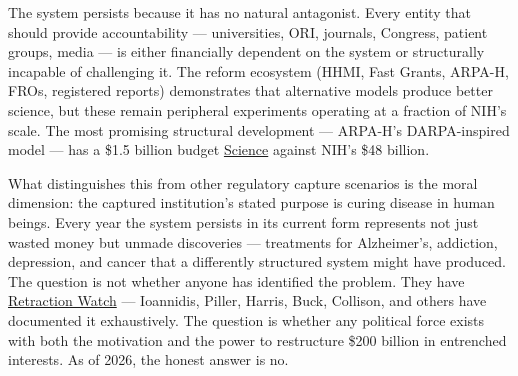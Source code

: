 The system persists because it has no natural antagonist. Every entity that should provide accountability --- universities, ORI, journals, Congress, patient groups, media --- is either financially dependent on the system or structurally incapable of challenging it. The reform ecosystem (HHMI, Fast Grants, ARPA-H, FROs, registered reports) demonstrates that alternative models produce better science, but these remain peripheral experiments operating at a fraction of NIH's scale. The most promising structural development --- ARPA-H's DARPA-inspired model --- has a \$1.5 billion budget \href{https://www.science.org/content/article/final-nih-budget-2024-essentially-flat}{Science} against NIH's \$48 billion.

What distinguishes this from other regulatory capture scenarios is the moral dimension: the captured institution's stated purpose is curing disease in human beings. Every year the system persists in its current form represents not just wasted money but unmade discoveries --- treatments for Alzheimer's, addiction, depression, and cancer that a differently structured system might have produced. The question is not whether anyone has identified the problem. They have \href{https://retractionwatch.com/2017/04/04/failure-essential-part-science-qa-author-new-book-reproducibility/}{Retraction Watch} --- Ioannidis, Piller, Harris, Buck, Collison, and others have documented it exhaustively. The question is whether any political force exists with both the motivation and the power to restructure \$200 billion in entrenched interests. As of 2026, the honest answer is no.

